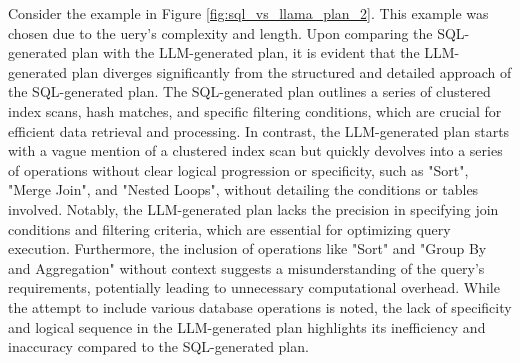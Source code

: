 Consider the example in Figure \ref{fig:sql_vs_llama_plan_2}. This example was chosen due to the uery's complexity and length. Upon comparing the SQL-generated plan with the LLM-generated plan, it is evident that the LLM-generated plan diverges significantly from the structured and detailed approach of the SQL-generated plan. The SQL-generated plan outlines a series of clustered index scans, hash matches, and specific filtering conditions, which are crucial for efficient data retrieval and processing. In contrast, the LLM-generated plan starts with a vague mention of a clustered index scan but quickly devolves into a series of operations without clear logical progression or specificity, such as "Sort", "Merge Join", and "Nested Loops", without detailing the conditions or tables involved. Notably, the LLM-generated plan lacks the precision in specifying join conditions and filtering criteria, which are essential for optimizing query execution. Furthermore, the inclusion of operations like "Sort" and "Group By and Aggregation" without context suggests a misunderstanding of the query's requirements, potentially leading to unnecessary computational overhead. While the attempt to include various database operations is noted, the lack of specificity and logical sequence in the LLM-generated plan highlights its inefficiency and inaccuracy compared to the SQL-generated plan.

